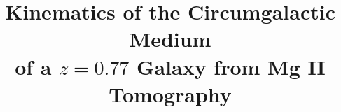 \documentclass[twocolumn]{aastex62}
\newcommand{\MgII}{Mg\tiny{ }\footnotesize{II}\normalsize{ }}
\begin{document}

\title{
Kinematics of the Circumgalactic Medium\\of a $z=0.77$ Galaxy from \MgII Tomography
}


\end{document}
